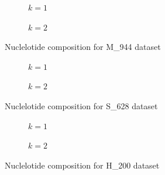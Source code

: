    \begin{figure}[H]
      \centering
      \begin{subfigure}{0.47\textwidth}
        \centering
        \resizebox{\textwidth}{!}{}
        \captionsetup{justification=centering}
        \caption{$k = 1$}
      \end{subfigure}%
      \hspace{0.05\textwidth}
      \begin{subfigure}{0.47\textwidth}
        \centering
        \resizebox{\textwidth}{!}{}
        \captionsetup{justification=centering}
        \caption{$k = 2$}
      \end{subfigure}%
      \caption{Nuclelotide composition for M\_944 dataset}\label{fig:nc_m_944}
    \end{figure}

    \begin{figure}[H]
      \centering
      \begin{subfigure}{0.47\textwidth}
        \centering
        \resizebox{\textwidth}{!}{}
        \captionsetup{justification=centering}
        \caption{$k = 1$}
      \end{subfigure}%
      \hspace{0.05\textwidth}
      \begin{subfigure}{0.47\textwidth}
        \centering
        \resizebox{\textwidth}{!}{}
        \captionsetup{justification=centering}
        \caption{$k = 2$}
      \end{subfigure}%
      \caption{Nuclelotide composition for S\_628 dataset}\label{fig:nc_s_628}
    \end{figure}

    \begin{figure}[H]
      \centering
      \begin{subfigure}{0.47\textwidth}
        \centering
        \resizebox{\textwidth}{!}{}
        \captionsetup{justification=centering}
        \caption{$k = 1$}
      \end{subfigure}%
      \hspace{0.05\textwidth}
      \begin{subfigure}{0.47\textwidth}
        \centering
        \resizebox{\textwidth}{!}{}
        \captionsetup{justification=centering}
        \caption{$k = 2$}
      \end{subfigure}%
      \caption{Nuclelotide composition for H\_200 dataset}\label{fig:nc_h_200}
    \end{figure}

